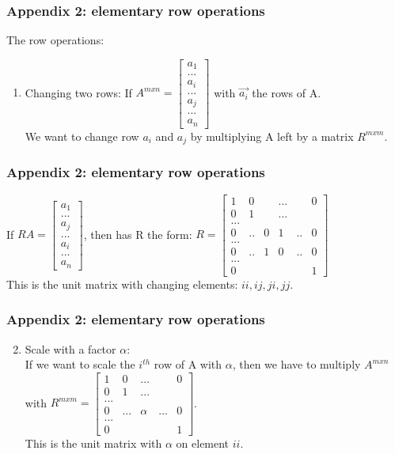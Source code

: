 \begin{frame}
	\frametitle{Appendix 2: elementary row operations}
	The row operations:
	\begin{enumerate}
		\item Changing two rows:
		If $A^{mxn}=\begin{bmatrix}
		a_1\\...\\a_i\\...\\a_j\\...\\a_n 
		\end{bmatrix}$ with $\overrightarrow{a_i}$ the rows of A. \\
		We want to change row $a_i$ and $a_j$ by multiplying A left by a matrix $R^{mxm}$. 
	\end{enumerate}
\end{frame}

\begin{frame}
	\frametitle{Appendix 2: elementary row operations}
		If $RA=\begin{bmatrix}
		a_1\\...\\a_j\\...\\a_i\\...\\a_n 
		\end{bmatrix}$, then has R the form: $R=\begin{bmatrix}
		1 & 0 & & ...& & 0\\
		0 & 1 & & ... &  & \\
		... & & & & & \\
		0 & .. & 0 & 1 & .. & 0\\
		... & & &  & & \\
		0 & .. & 1 & 0 & .. & 0\\
		... &  & & & & \\
		0 & & & & & 1
		\end{bmatrix}$\\
		This is the unit matrix with changing elements: $ii,ij,ji,jj$.
\end{frame}

\begin{frame}
	\frametitle{Appendix 2: elementary row operations}
	\begin{enumerate}
		\setcounter{enumi}{1}
		\item Scale with a factor $\alpha$: \\
		If we want to scale the $i^{th}$ row of A with $\alpha$, then we have to multiply $A^{mxn}$ with $R^{mxm}=\begin{bmatrix}
			1 & 0 & ... & & 0\\
			0 & 1 & ... & & \\
			... & & & \\
			0 & ... & \alpha & ... & 0\\
			... & & & & \\
			0 & & & & 1
		\end{bmatrix}$. \\
		This is the unit matrix with $\alpha$ on element $ii$.
	\end{enumerate}
\end{frame}

